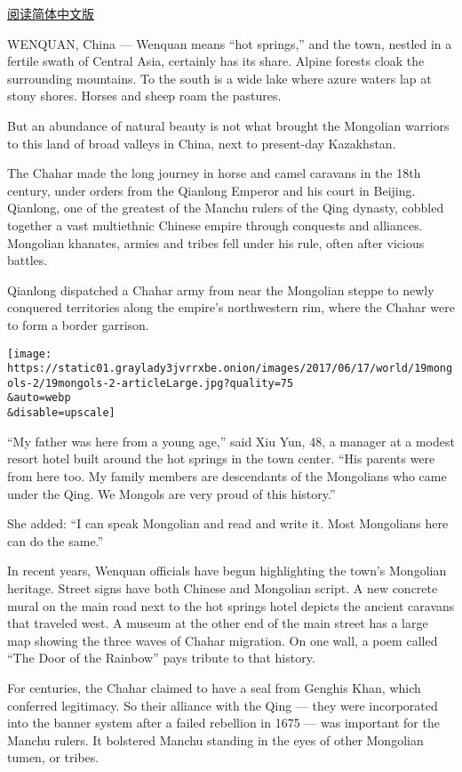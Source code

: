 \href{https://cn.nytimes3xbfgragh.onion/china/20170619/mongolian-warriors-and-communist-soldiers-a-frontier-town-in-china/}{阅读简体中文版}

WENQUAN, China --- Wenquan means ``hot springs,'' and the town, nestled
in a fertile swath of Central Asia, certainly has its share. Alpine
forests cloak the surrounding mountains. To the south is a wide lake
where azure waters lap at stony shores. Horses and sheep roam the
pastures.

But an abundance of natural beauty is not what brought the Mongolian
warriors to this land of broad valleys in China, next to present-day
Kazakhstan.

The Chahar made the long journey in horse and camel caravans in the 18th
century, under orders from the Qianlong Emperor and his court in
Beijing. Qianlong, one of the greatest of the Manchu rulers of the Qing
dynasty, cobbled together a vast multiethnic Chinese empire through
conquests and alliances. Mongolian khanates, armies and tribes fell
under his rule, often after vicious battles.

Qianlong dispatched a Chahar army from near the Mongolian steppe to
newly conquered territories along the empire's northwestern rim, where
the Chahar were to form a border garrison.

\texttt{[image: https://static01.graylady3jvrrxbe.onion/images/2017/06/17/world/19mongols-2/19mongols-2-articleLarge.jpg?quality=75\\\&auto=webp\\\&disable=upscale]}

``My father was here from a young age,'' said Xiu Yun, 48, a manager at
a modest resort hotel built around the hot springs in the town center.
``His parents were from here too. My family members are descendants of
the Mongolians who came under the Qing. We Mongols are very proud of
this history.''

She added: ``I can speak Mongolian and read and write it. Most
Mongolians here can do the same.''

In recent years, Wenquan officials have begun highlighting the town's
Mongolian heritage. Street signs have both Chinese and Mongolian script.
A new concrete mural on the main road next to the hot springs hotel
depicts the ancient caravans that traveled west. A museum at the other
end of the main street has a large map showing the three waves of Chahar
migration. On one wall, a poem called ``The Door of the Rainbow'' pays
tribute to that history.

For centuries, the Chahar claimed to have a seal from Genghis Khan,
which conferred legitimacy. So their alliance with the Qing --- they
were incorporated into the banner system after a failed rebellion in
1675 --- was important for the Manchu rulers. It bolstered Manchu
standing in the eyes of other Mongolian tumen, or tribes.


